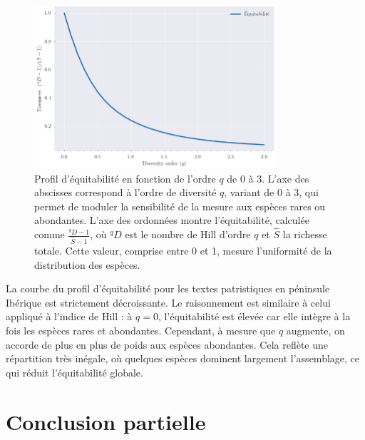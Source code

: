 \documentclass[a4paper,twoside,12pt]{book}
\begin{document}
\begin{figure}[H]
	\centering
	\includegraphics[width=0.8\textwidth]{img/evenness.png}
	\caption[\textbf{Profil d’équitabilité en fonction de l’ordre \(q\)}]{%
		Profil d’équitabilité en fonction de l’ordre \(q\) de 0 à 3. 
		L’axe des abscisses correspond à l’ordre de diversité \(q\), variant de 0 à 3, qui permet de moduler la sensibilité de la mesure aux espèces rares ou abondantes. L’axe des ordonnées montre l’équitabilité, calculée comme 
		$\frac{{}^q D - 1}{\hat{S} - 1}$,
		où \({}^q D\) est le nombre de Hill d’ordre \(q\) et \(\hat{S}\) la richesse totale. Cette valeur, comprise entre 0 et 1, mesure l’uniformité de la distribution des espèces. 
	}
	\label{fig:ton_label}
\end{figure}


La courbe du profil d’équitabilité pour les textes patristiques en péninsule Ibérique est strictement décroissante. Le raisonnement est similaire à celui appliqué à l’indice de Hill : à \( q = 0 \), l’équitabilité est élevée car elle intègre à la fois les espèces rares et abondantes. Cependant, à mesure que \( q \) augmente, on accorde de plus en plus de poids aux espèces abondantes. Cela reflète une répartition très inégale, où quelques espèces dominent largement l’assemblage, ce qui réduit l’équitabilité globale. 

\section{Conclusion partielle}
\end{document}
